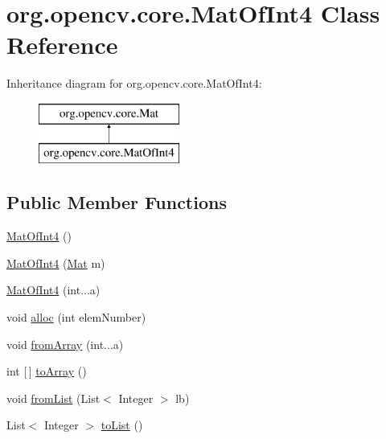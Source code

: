 \hypertarget{classorg_1_1opencv_1_1core_1_1_mat_of_int4}{}\section{org.\+opencv.\+core.\+Mat\+Of\+Int4 Class Reference}
\label{classorg_1_1opencv_1_1core_1_1_mat_of_int4}
Inheritance diagram for org.\+opencv.\+core.\+Mat\+Of\+Int4\+:\begin{figure}[H]
\begin{center}
\leavevmode
\includegraphics[height=2.000000cm]{classorg_1_1opencv_1_1core_1_1_mat_of_int4}
\end{center}
\end{figure}
\subsection*{Public Member Functions}
\begin{DoxyCompactItemize}
\item 
\mbox{\hyperlink{classorg_1_1opencv_1_1core_1_1_mat_of_int4_a275fe3edf9507fb598dd475766dc02b1}{Mat\+Of\+Int4}} ()
\item 
\mbox{\hyperlink{classorg_1_1opencv_1_1core_1_1_mat_of_int4_a8ad0cc7af305281f2149443b55704c9f}{Mat\+Of\+Int4}} (\mbox{\hyperlink{classorg_1_1opencv_1_1core_1_1_mat}{Mat}} m)
\item 
\mbox{\hyperlink{classorg_1_1opencv_1_1core_1_1_mat_of_int4_a2ea1f18537375b3465f2f834b6bbeb74}{Mat\+Of\+Int4}} (int...\+a)
\item 
void \mbox{\hyperlink{classorg_1_1opencv_1_1core_1_1_mat_of_int4_addad760873831767ad4b1dc248f6c334}{alloc}} (int elem\+Number)
\item 
void \mbox{\hyperlink{classorg_1_1opencv_1_1core_1_1_mat_of_int4_a95df6884fb80d78dd6cb917b87434c3e}{from\+Array}} (int...\+a)
\item 
int \mbox{[}$\,$\mbox{]} \mbox{\hyperlink{classorg_1_1opencv_1_1core_1_1_mat_of_int4_ab3c546938d500a132c3dfc0fc1875923}{to\+Array}} ()
\item 
void \mbox{\hyperlink{classorg_1_1opencv_1_1core_1_1_mat_of_int4_a861608ad0aedb0660407e52d9d2a53e0}{from\+List}} (List$<$ Integer $>$ lb)
\item 
List$<$ Integer $>$ \mbox{\hyperlink{classorg_1_1opencv_1_1core_1_1_mat_of_int4_a91d5aa3fdd77e23ba51431ebd8efc4a7}{to\+List}} ()
\end{DoxyCompactItemize}
